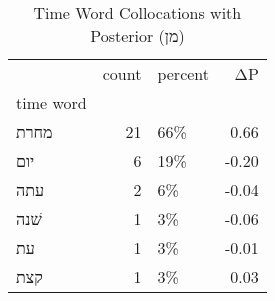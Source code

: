 \begin{table}[htbp!]
\centering
\caption{Time Word Collocations with Posterior (מן)}
\label{table:postמן_head_cpd}
\begin{tabular}{lrlr}
\toprule
{} &  count & percent &    ΔP \\
time word &        &         &       \\
\midrule
מחרת      &     21 &     66\% &  0.66 \\
יום       &      6 &     19\% & -0.20 \\
עתה       &      2 &      6\% & -0.04 \\
שׁנה      &      1 &      3\% & -0.06 \\
עת        &      1 &      3\% & -0.01 \\
קצת       &      1 &      3\% &  0.03 \\
\bottomrule
\end{tabular}
\end{table}
